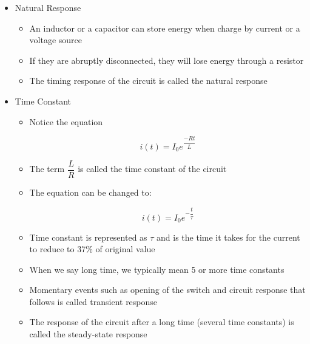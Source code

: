 \begin{itemize}

  \item Natural Response

    \begin{itemize}

      \item An inductor or a capacitor can store energy when charge by current or a voltage source

      \item If they are abruptly disconnected, they will lose energy through a resistor

      \item The timing response of the circuit is called the natural response

    \end{itemize}

  \item Time Constant

    \begin{itemize}

      \item Notice the equation

      $$\boxed{i(t)=I_0e^{\dfrac{-Rt}{L}}}$$

      \item The term $\dfrac{L}{R}$ is called the time constant of the circuit

      \item The equation can be changed to:

        $$\boxed{i(t)= I_0e^{-\dfrac{t}{\tau}}}$$

        \item Time constant is represented as $\tau$ and is the time it takes for the current to reduce to 37\% of original value

        \item When we say long time, we typically mean 5 or more time constants

        \item Momentary events such as opening of the switch and circuit response that follows is called transient response

        \item The response of the circuit after a long time (several time constants) is called the steady-state response

    \end{itemize}

\end{itemize}



